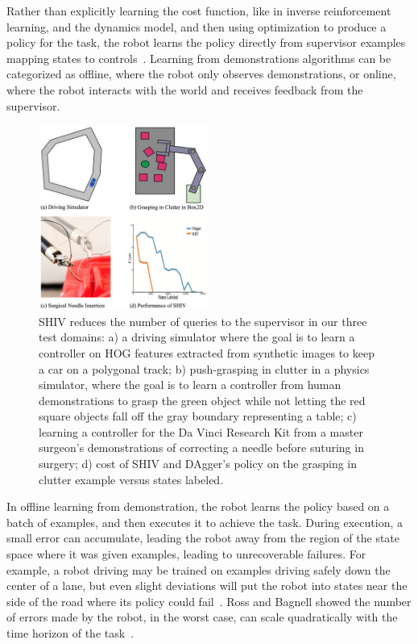 \documentclass[10pt, conference]{ieeeconf}      %
\begin{document}
Rather than explicitly learning the cost function, like in inverse reinforcement learning, and the dynamics model, and then using optimization to produce a policy for the task, the robot learns the policy directly from supervisor examples mapping states to controls~\cite{argall2009survey}. Learning from demonstrations algorithms can be categorized as offline, where the robot only observes demonstrations, or online, where the robot interacts with the world and receives feedback from the supervisor. 


\begin{figure}[ht]
\centering
   
\includegraphics[width=0.5\textwidth]{figures/teaser.pdf}
\caption{ 
SHIV  reduces the number of queries to the supervisor in our three test domains: a) a driving simulator where the goal is to learn a controller on HOG features extracted from synthetic images to keep a car on a polygonal track; b) push-grasping in clutter in a physics simulator, where the goal is to learn a controller from human demonstrations to grasp the green object while not letting the red square objects fall off the gray boundary representing a table; c) learning a controller for the Da Vinci Research Kit from a master surgeon's demonstrations of correcting a needle before suturing in surgery; d) cost of SHIV and DAgger's policy on the grasping in clutter example versus states labeled.
}
\vspace*{-10pt}
\label{fig:teaser}
\end{figure}





In offline learning from demonstration, the robot learns the policy based on a batch of examples, and then executes it to achieve the task.  During execution, a small error can accumulate, leading the robot away from the region of the state space where it was given examples, leading to unrecoverable failures.  For example, a robot driving may be trained on examples driving safely down the center of a lane, but even slight deviations will put the robot into states near the side of the road where its policy could  fail~\cite{pomerleau1989alvinn}. Ross and Bagnell showed the number of errors made by the robot, in the worst case,  can scale quadratically with the time horizon of the task~\cite{ross2010efficient}.
\end{document}

